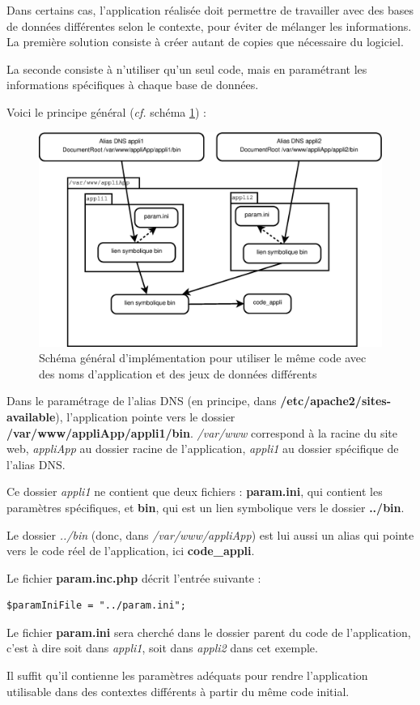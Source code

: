 Dans certains cas, l'application réalisée doit permettre de travailler avec des bases de données différentes selon le contexte, pour éviter de mélanger les informations. La première solution consiste à créer autant de copies que nécessaire du logiciel.

La seconde consiste à n'utiliser qu'un seul code, mais en paramétrant les informations spécifiques à chaque base de données.

Voici le principe général (\textit{cf.} schéma \ref{dnsmultipleschema})  :
\begin{figure}[th]
\label{dnsmultipleschema}
\includegraphics[width=\linewidth]{dessin/dnsmultiple}
\caption{Schéma général d'implémentation pour utiliser le même code avec des noms d'application et des jeux de données différents}
\end{figure}

Dans le paramétrage de l'alias DNS (en principe, dans \textbf{/etc/apache2/sites-available}), l'application pointe vers le dossier \textbf{/var/www/appliApp/appli1/bin}. 
\textit{/var/www} correspond à la racine du site web, \textit{appliApp} au dossier racine de l'application, \textit{appli1} au dossier spécifique de l'alias DNS.

Ce dossier \textit{appli1} ne contient que deux fichiers : \textbf{param.ini}, qui contient les paramètres spécifiques, et \textbf{bin}, qui est un lien symbolique vers le dossier \textbf{../bin}. 

Le dossier \textit{../bin} (donc, dans \textit{/var/www/appliApp}) est lui aussi un alias qui pointe vers le code réel de l'application, ici \textbf{code\_appli}.

Le fichier \textbf{param.inc.php} décrit l'entrée suivante :
\begin{lstlisting}
$paramIniFile = "../param.ini";
\end{lstlisting}

Le fichier \textbf{param.ini} sera cherché dans le dossier parent du code de l'application, c'est à dire soit dans \textit{appli1}, soit dans \textit{appli2} dans cet exemple.

Il suffit qu'il contienne les paramètres adéquats pour rendre l'application utilisable dans des contextes différents à partir du même code initial.